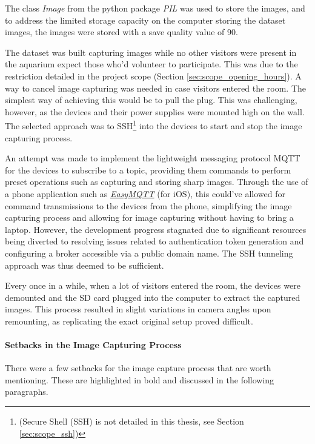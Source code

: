 The class \textit{Image} from the python package \textit{PIL} was used to store the images, and to address the limited storage capacity on the computer storing the dataset images, the images were stored with a save quality value of 90.

The dataset was built capturing images while no other visitors were present in the aquarium expect those who'd volunteer to participate. This was due to the restriction detailed in the project scope (Section \ref{sec:scope_opening_hours}). A way to cancel image capturing was needed in case visitors entered the room. The simplest way of achieving this would be to pull the plug. This was challenging, however, as the devices and their power supplies were mounted high on the wall. The selected approach was to SSH\footnote{(Secure Shell (SSH) is not detailed in this thesis, see Section \ref{sec:scope_ssh})} into the devices to start and stop the image capturing process. 

An attempt was made to implement the lightweight messaging protocol MQTT for the devices to subscribe to a topic, providing them commands to perform preset operations such as capturing and storing sharp images. Through the use of a phone application such as \href{https://www.easymqtt.app/}{\textit{EasyMQTT}} (for iOS), this could've allowed for command transmissions to the devices from the phone, simplifying the image capturing process and allowing for image capturing without having to bring a laptop. However, the development progress stagnated due to significant resources being diverted to resolving issues related to authentication token generation and configuring a broker accessible via a public domain name. The SSH tunneling approach was thus deemed to be sufficient.

Every once in a while, when a lot of visitors entered the room, the devices were demounted and the SD card plugged into the computer to extract the captured images. This process resulted in slight variations in camera angles upon remounting, as replicating the exact original setup proved difficult. 

\paragraph{Setbacks in the Image Capturing Process}
\label{sec:challenges_in_image_capturing}
There were a few setbacks for the image capture process that are worth mentioning. These are highlighted in bold and discussed in the following paragraphs.

